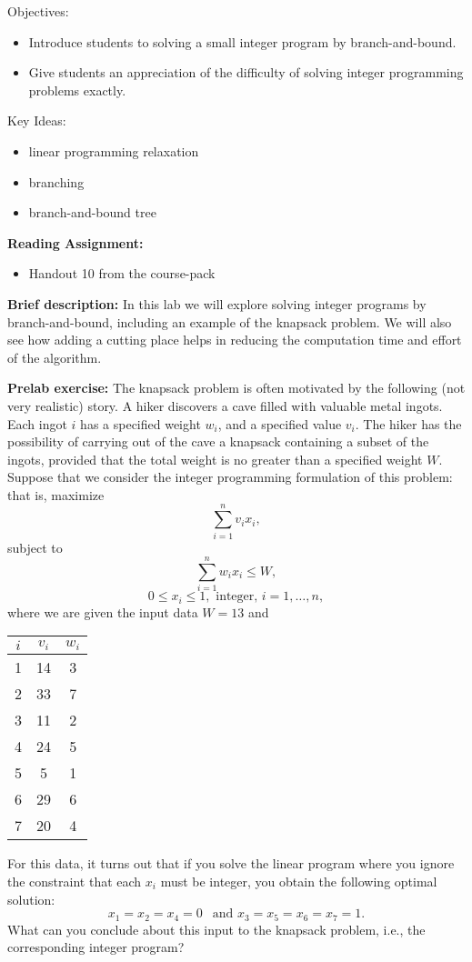 \documentclass[twoside]{article}%
\begin{document}

\noindent
Objectives:

\begin{itemize}
\item   Introduce students to solving a small integer program by
branch-and-bound.
\item   Give students an appreciation of the difficulty of solving
integer programming problems exactly.
\end{itemize}

\noindent
Key Ideas:
\begin{itemize}
\item   linear programming relaxation
\item   branching
\item   branch-and-bound tree
\end{itemize}
\textbf{Reading Assignment:}
\begin{itemize}
\item
Handout 10 from the course-pack
\end{itemize}

\noindent
\textbf{Brief description:}
In this lab we will explore solving integer programs by branch-and-bound, including an example of the knapsack problem. We will also see how adding a cutting place helps in reducing the computation time and effort of the algorithm.

\smallskip
\noindent
\textbf{Prelab exercise:}
The knapsack problem is often
motivated by the following (not very realistic) story.
A hiker discovers a cave filled with valuable metal ingots.
Each ingot $i$ has a specified weight $w_i$, and a specified
value $v_i$. The hiker has the possibility of carrying out of
the cave a knapsack containing a subset of the ingots, provided
that the total weight is no greater than a specified weight $W$.
Suppose that we consider the integer programming formulation
of this problem: that is, maximize
$$\sum_{i=1}^n v_i x_i,$$
\noindent
subject to
$$\sum_{i=1}^n w_i x_i \le W,$$
$$0 \le x_i \le 1, {\mbox{ integer, }} i=1,\ldots,n,$$
where we are given the input data $W=13$ and
\begin{center}
\begin{tabular}{c|c|c}
$i$ & $v_i$ & $w_i$ \\
\hline
1 & 14 & 3\\
2 & 33 & 7 \\
3 & 11 & 2 \\
4 & 24 & 5 \\
5 & 5 & 1 \\
6 & 29 & 6 \\
7 & 20 & 4
\end{tabular}
\end{center}
\newpage
\noindent 
For this data, it turns out that if you solve the linear program where you ignore the constraint that each $x_i$ must be integer, you obtain the following optimal solution:
$$ x_1 = x_2 = x_4 = 0  \ \ \text{ and } x_3 = x_5 = x_6 =x_ 7 =1 .$$
What can you conclude about this input to the knapsack problem, i.e., the corresponding integer program?
\end{document}
